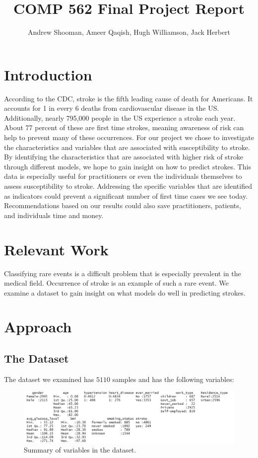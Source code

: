 \documentclass{article}
\title{COMP 562 Final Project Report}
\author{Andrew Shooman, Ameer Qaqish, Hugh Williamson, Jack Herbert}
\begin{document}
\maketitle

\section{Introduction}

According to the CDC, stroke is the fifth leading cause of death for Americans. It accounts for 1 in every 6 deaths from cardiovascular disease in the US. Additionally, nearly 795,000 people in the US experience a stroke each year. About 77 percent of these are first time strokes, meaning awareness of risk can help to prevent many of these occurrences. For our project we chose to investigate the characteristics and variables that are associated with susceptibility to stroke. By identifying the characteristics that are associated with higher risk of stroke through different models, we hope to gain insight on how to predict strokes. This data is especially useful for practitioners or even the individuals themselves to assess susceptibility to stroke. Addressing the specific variables that are identified as indicators could prevent a significant number of first time cases we see today. Recommendations based on our results could also save practitioners, patients, and individuals time and money. 


\section{Relevant Work}

Classifying rare events is a difficult problem that is especially prevalent in the medical field. Occurrence of stroke is an example of such a rare event. We examine a dataset to gain insight on what models do well in predicting strokes.

\section{Approach}

\subsection{The Dataset}
The dataset we examined has $5110$ samples and has the following variables:

\begin{figure}[h]
\caption{Summary of variables in the dataset.}
\centering
\includegraphics[width = \textwidth]{covariates.png}
\end{figure}
\end{document}
